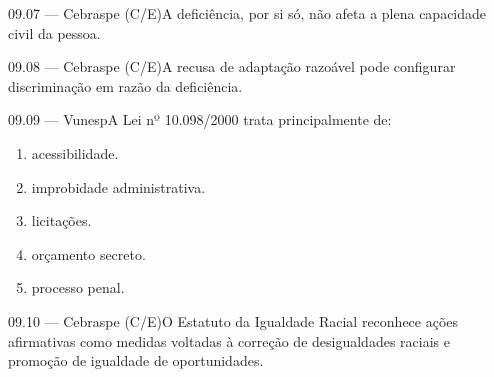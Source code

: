 \begin{questao}{ 09.07 — Cebraspe (C/E)}A deficiência, por si só, não afeta a plena capacidade civil da pessoa.\end{questao}
\begin{questao}{ 09.08 — Cebraspe (C/E)}A recusa de adaptação razoável pode configurar discriminação em razão da deficiência.\end{questao}
\begin{questao}{ 09.09 — Vunesp}A Lei nº 10.098/2000 trata principalmente de:\begin{enumerate}[label=\Alph*)]\item acessibilidade.\item improbidade administrativa.\item licitações.\item orçamento secreto.\item processo penal.\end{enumerate}\end{questao}
\begin{questao}{ 09.10 — Cebraspe (C/E)}O Estatuto da Igualdade Racial reconhece ações afirmativas como medidas voltadas à correção de desigualdades raciais e promoção de igualdade de oportunidades.\end{questao}


